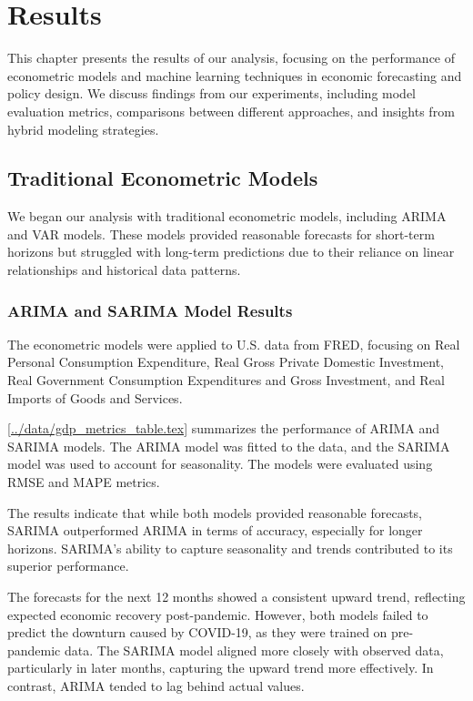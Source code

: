 \chapter{Results}
\label{sec:results}

This chapter presents the results of our analysis, focusing on the performance of econometric models and machine learning techniques in economic forecasting and policy design. We discuss findings from our experiments, including model evaluation metrics, comparisons between different approaches, and insights from hybrid modeling strategies.

\section{Traditional Econometric Models}
\label{subsec:traditional_econometric_models}

We began our analysis with traditional econometric models, including ARIMA and VAR models. These models provided reasonable forecasts for short-term horizons but struggled with long-term predictions due to their reliance on linear relationships and historical data patterns.

\subsection{ARIMA and SARIMA Model Results}
\label{subsubsec:arima_results}

The econometric models were applied to U.S. data from FRED, focusing on Real Personal Consumption Expenditure, Real Gross Private Domestic Investment, Real Government Consumption Expenditures and Gross Investment, and Real Imports of Goods and Services.

\ref{../data/gdp_metrics_table.tex} summarizes the performance of ARIMA and SARIMA models. The ARIMA model was fitted to the data, and the SARIMA model was used to account for seasonality. The models were evaluated using RMSE and MAPE metrics.

The results indicate that while both models provided reasonable forecasts, SARIMA outperformed ARIMA in terms of accuracy, especially for longer horizons. SARIMA's ability to capture seasonality and trends contributed to its superior performance.

The forecasts for the next 12 months showed a consistent upward trend, reflecting expected economic recovery post-pandemic. However, both models failed to predict the downturn caused by COVID-19, as they were trained on pre-pandemic data. The SARIMA model aligned more closely with observed data, particularly in later months, capturing the upward trend more effectively. In contrast, ARIMA tended to lag behind actual values.

